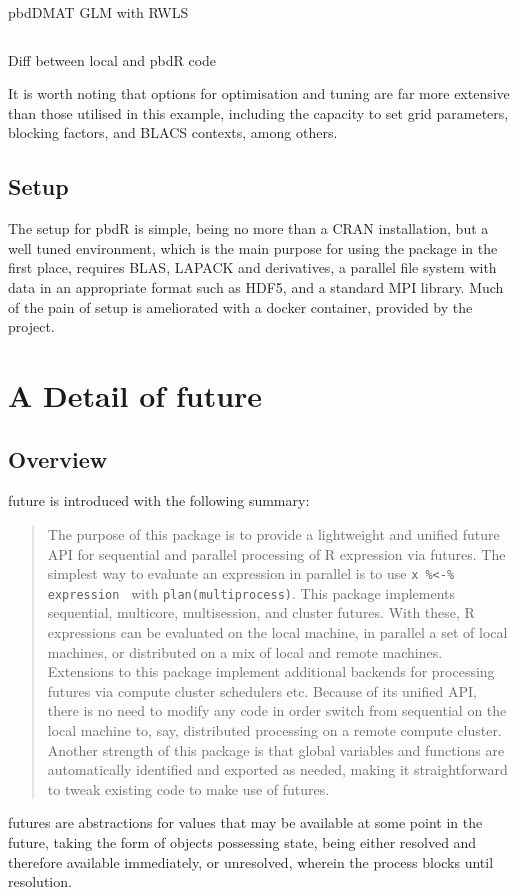 \documentclass[a4paper,10pt]{article}
\begin{document}
\begin{listing}
\inputminted{r}{R/review-pbdr.R}
	\caption{pbdDMAT GLM with RWLS}
	\label{src:dmat}
\end{listing}

\begin{listing}
\inputminted{r}{R/review-pbdr.diff}
	\caption{Diff between local and pbdR code}
	\label{src:diff}
\end{listing}

It is worth noting that options for optimisation and tuning are far more
extensive than those utilised in this example, including the capacity to set
grid parameters, blocking factors, and BLACS contexts, among others.

\subsection{Setup}

The setup for pbdR is simple, being no more than a CRAN installation, but a
well tuned environment, which is the main purpose for using the package in the
first place, requires BLAS, LAPACK and derivatives, a parallel file system with
data in an appropriate format such as HDF5, and a standard MPI library. Much of
the pain of setup is ameliorated with a docker container, provided by the
project.

\section{A Detail of future}

\subsection{Overview}
\label{sec:overview}
\nocite{bengtsson19:_futur_r}

future is introduced with the following summary: \blockquote{The
purpose of this package is to provide a lightweight and unified
future API for sequential and parallel processing of R expression
via futures. The simplest way to evaluate an expression in parallel
is to use \texttt{x \%<-\% { expression }} with
\texttt{plan(multiprocess)}. This package implements sequential,
multicore, multisession, and cluster futures. With these, R
expressions can be evaluated on the local machine, in parallel a set
of local machines, or distributed on a mix of local and remote
machines. Extensions to this package implement additional backends
for processing futures via compute cluster schedulers etc. Because
of its unified API, there is no need to modify any code in order
switch from sequential on the local machine to, say, distributed
processing on a remote compute cluster. Another strength of this
package is that global variables and functions are automatically
identified and exported as needed, making it straightforward to
tweak existing code to make use of futures.\cite{bengtsson20}}
futures are abstractions for values that may be available at some
point in the future, taking the form of objects possessing state,
being either resolved and therefore available immediately, or
unresolved, wherein the process blocks until resolution.
\end{document}
